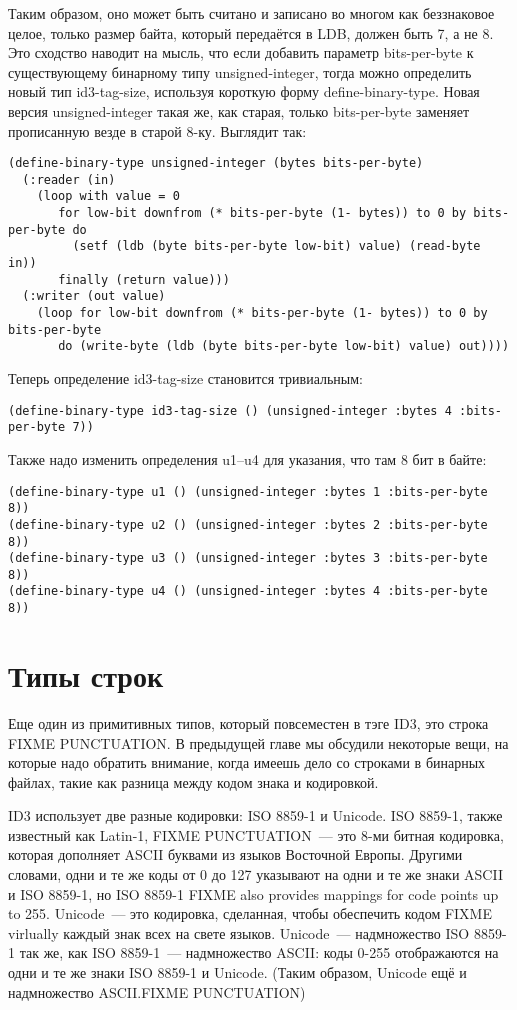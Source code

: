 Таким образом, оно может быть считано и записано во многом как беззнаковое целое, только
размер байта, который передаётся в LDB, должен быть 7, а не 8.  Это сходство наводит на
мысль, что если добавить параметр bits-per-byte к существующему бинарному типу
unsigned-integer, тогда можно определить новый тип id3-tag-size, используя короткую форму
define-binary-type.  Новая версия unsigned-integer такая же, как старая, только
bits-per-byte заменяет прописанную везде в старой 8-ку.  Выглядит так:

\begin{lstlisting}
(define-binary-type unsigned-integer (bytes bits-per-byte)
  (:reader (in)
    (loop with value = 0
       for low-bit downfrom (* bits-per-byte (1- bytes)) to 0 by bits-per-byte do
         (setf (ldb (byte bits-per-byte low-bit) value) (read-byte in))
       finally (return value)))
  (:writer (out value)
    (loop for low-bit downfrom (* bits-per-byte (1- bytes)) to 0 by bits-per-byte
       do (write-byte (ldb (byte bits-per-byte low-bit) value) out))))
\end{lstlisting}

Теперь определение id3-tag-size становится тривиальным:

\begin{lstlisting}
(define-binary-type id3-tag-size () (unsigned-integer :bytes 4 :bits-per-byte 7))
\end{lstlisting}

Также надо изменить определения u1--u4 для указания, что там 8 бит в байте:

\begin{lstlisting}
(define-binary-type u1 () (unsigned-integer :bytes 1 :bits-per-byte 8))
(define-binary-type u2 () (unsigned-integer :bytes 2 :bits-per-byte 8))
(define-binary-type u3 () (unsigned-integer :bytes 3 :bits-per-byte 8))
(define-binary-type u4 () (unsigned-integer :bytes 4 :bits-per-byte 8))
\end{lstlisting}

\section{Типы строк}

Еще один из примитивных типов, который повсеместен в тэге ID3, это строка FIXME
PUNCTUATION.  В предыдущей главе мы обсудили некоторые вещи, на которые надо обратить
внимание, когда имеешь дело со строками в бинарных файлах, такие как разница между кодом
знака и кодировкой.

ID3 использует две разные кодировки: ISO 8859-1 и Unicode. ISO 8859-1, также известный как
Latin-1, FIXME PUNCTUATION~--- это 8-ми битная кодировка, которая дополняет ASCII буквами
из языков Восточной Европы.  Другими словами, одни и те же коды от 0 до 127 указывают на
одни и те же знаки ASCII и ISO 8859-1, но ISO 8859-1 FIXME also provides mappings for code
points up to 255.  Unicode~--- это кодировка, сделанная, чтобы обеспечить кодом FIXME
virlually каждый знак всех на свете языков.  Unicode~--- надмножество ISO 8859-1 так же,
как ISO 8859-1~--- надмножество ASCII: коды 0-255 отображаются на одни и те же знаки ISO
8859-1 и Unicode. (Таким образом, Unicode ещё и надмножество ASCII.FIXME PUNCTUATION)

